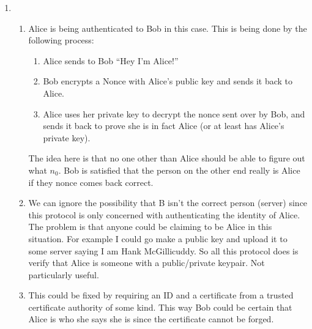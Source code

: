 \documentclass{article}
\begin{document}
\begin{enumerate}
  \item
    \begin{enumerate}

      \item
        Alice is being authenticated to Bob in this case. This is being done by the following process:
      \begin{enumerate}
        \item Alice sends to Bob ``Hey I'm Alice!''
        \item Bob encrypts a Nonce with Alice's public key and sends it back to Alice.
        \item Alice uses her private key to decrypt the nonce sent over by Bob, and sends it back to prove she is in fact Alice (or at least has Alice's private key).
      \end{enumerate}

      The idea here is that no one other than Alice should be able to figure out what $n_0$. Bob is satisfied that the person on the other end really is Alice if they nonce comes back correct.
      \item
        We can ignore the possibility that B isn't the correct person (server) since this protocol is only concerned with authenticating the identity of Alice. The problem is that anyone could be claiming to be Alice in this situation. For example I could go make a public key and upload it to some server saying I am Hank McGillicuddy. So all this protocol does is verify that Alice is someone with a public/private keypair. Not particularly useful.
      \item
        This could be fixed by requiring an ID and a certificate from a trusted certificate authority of some kind. This way Bob could be certain that Alice is who she says she is since the certificate cannot be forged.
    \end{enumerate}
    

\end{enumerate}
\end{document}
